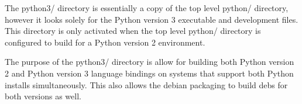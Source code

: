 The python3/ directory is essentially a copy of the top level python/ directory, however it looks solely for the Python version 3 executable and development files. This directory is only activated when the top level python/ directory is configured to build for a Python version 2 environment.

The purpose of the python3/ directory is allow for building both Python version 2 and Python version 3 language bindings on systems that support both Python installs simultaneously. This also allows the debian packaging to build debs for both versions as well. 
